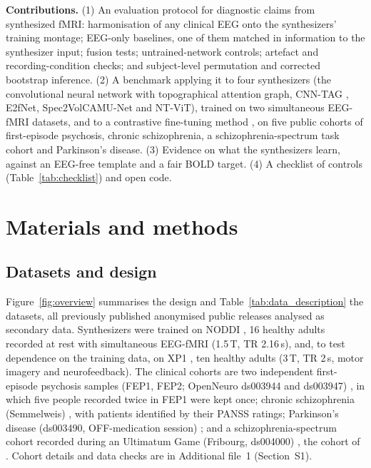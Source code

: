 \documentclass[pdflatex,referee,sn-basic]{sn-jnl}%
\begin{document}
\textbf{Contributions.} (1) An evaluation protocol for diagnostic claims from synthesized fMRI: harmonisation of any clinical EEG onto the synthesizers' training montage; EEG-only baselines, one of them matched in information to the synthesizer input; fusion tests; untrained-network controls; artefact and recording-condition checks; and subject-level permutation and corrected bootstrap inference. (2) A benchmark applying it to four synthesizers (the convolutional neural network with topographical attention graph, CNN-TAG \cite{calhas2022eeg}, E2fNet, Spec2VolCAMU-Net and NT-ViT), trained on two simultaneous EEG-fMRI datasets, and to a contrastive fine-tuning method \cite{calhas2023medrxiv}, on five public cohorts of first-episode psychosis, chronic schizophrenia, a schizophrenia-spectrum task cohort and Parkinson's disease. (3) Evidence on what the synthesizers learn, against an EEG-free template and a fair BOLD target. (4) A checklist of controls (Table~\ref{tab:checklist}) and open code.

\section{Materials and methods}\label{section:methods}

\subsection{Datasets and design}\label{materials:data}

Figure~\ref{fig:overview} summarises the design and Table~\ref{tab:data_description} the datasets, all previously published anonymised public releases analysed as secondary data. Synthesizers were trained on NODDI \cite{dataset_01,deligianni2016}, 16 healthy adults recorded at rest with simultaneous EEG-fMRI (1.5\,T, TR 2.16\,s), and, to test dependence on the training data, on XP1 \cite{lioi2020xp}, ten healthy adults (3\,T, TR 2\,s, motor imagery and neurofeedback). The clinical cohorts are two independent first-episode psychosis samples (FEP1, FEP2; OpenNeuro ds003944 and ds003947) \cite{salisbury_ds003944,salisbury_ds003947}, in which five people recorded twice in FEP1 were kept once; chronic schizophrenia (Semmelweis) \cite{racz2025}, with patients identified by their PANSS ratings; Parkinson's disease (ds003490, OFF-medication session) \cite{cavanagh_ds003490}; and a schizophrenia-spectrum cohort recorded during an Ultimatum Game (Fribourg, ds004000) \cite{dataset2022fribourg,horat2018impaired}, the cohort of \cite{calhas2023medrxiv}. Cohort details and data checks are in Additional file~1 (Section~S1).
\end{document}
